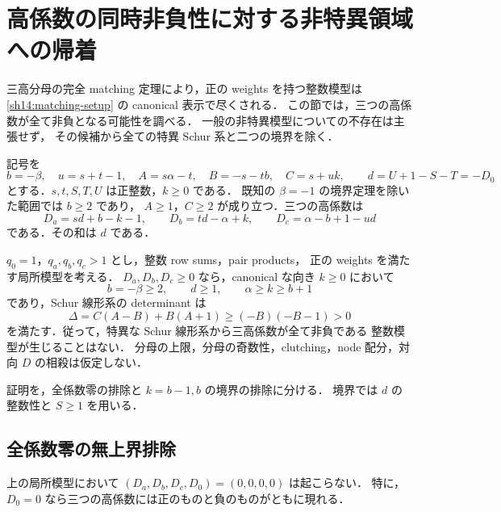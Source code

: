 \section{高係数の同時非負性に対する非特異領域への帰着}
\label{hd20:section}

三高分母の完全 matching 定理により，正の weights を持つ整数模型は
\ref{sh14:matching-setup} の canonical 表示で尽くされる．
この節では，三つの高係数が全て非負となる可能性を調べる．
一般の非特異模型についての不存在は主張せず，
その候補から全ての特異 Schur 系と二つの境界を除く．

記号を
\[
 b=-\beta,\quad u=s+t-1,\quad
 A=s\alpha-t,\quad B=-s-tb,\quad C=s+uk,
 \qquad d=U+1-S-T=-D_0
\]
とする．$s,t,S,T,U$ は正整数，$k\ge0$ である．
既知の $\beta=-1$ の境界定理を除いた範囲では $b\ge2$ であり，
$A\ge1$，$C\ge2$ が成り立つ．三つの高係数は
\begin{equation}\label{hd20:D}
 D_a=sd+b-k-1,\qquad
 D_b=td-\alpha+k,\qquad
 D_c=\alpha-b+1-ud
\end{equation}
である．その和は $d$ である．

\begin{theorem}[同時非負性が要求する非特異領域]
\label{hd20:nonsingular}
$q_0=1$，$q_a,q_b,q_c>1$ とし，整数 row sums，pair products，
正の weights を満たす局所模型を考える．
$D_a,D_b,D_c\ge0$ なら，canonical な向き $k\ge0$ において
\[
 b=-\beta\ge2,\qquad d\ge1,\qquad
 \alpha\ge k\ge b+1
\]
であり，Schur 線形系の determinant は
\begin{equation}\label{hd20:positive-det}
 \Delta=C(A-B)+B(A+1)
 \ge(-B)(-B-1)>0
\end{equation}
を満たす．従って，特異な Schur 線形系から三高係数が全て非負である
整数模型が生じることはない．
分母の上限，分母の奇数性，clutching，node 配分，対向 $D$ の相殺は仮定しない．
\end{theorem}

証明を，全係数零の排除と $k=b-1,b$ の境界の排除に分ける．
境界では $d$ の整数性と $S\ge1$ を用いる．

\subsection{全係数零の無上界排除}

\begin{proposition}
\label{hd20:no-zero-D}
上の局所模型において $(D_a,D_b,D_c,D_0)=(0,0,0,0)$ は起こらない．
特に，$D_0=0$ なら三つの高係数には正のものと負のものがともに現れる．
\end{proposition}

